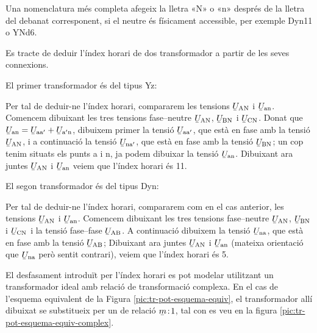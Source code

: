 Una nomenclatura més completa afegeix la lletra «N» o «n» després de la lletra del debanat corresponent, si el neutre és físicament accessible, per exemple Dyn11 o YNd6.


\begin{exemple}
    Es tracte de deduir l'índex horari de dos transformador a partir de les seves connexions.


    El primer transformador és del tipus Yz:
     \vspace{-2mm}
    \begin{center}
        
    \end{center}
     Per tal de deduir-ne l'índex horari, compararem les tensions
    $\cmplx{U}\ped{AN}$ i $\cmplx{U}\ped{an}$. Comencem dibuixant les tres tensions fase--neutre $\cmplx{U}\ped{AN}$, $\cmplx{U}\ped{BN}$ i $\cmplx{U}\ped{CN}$. Donat que $\cmplx{U}\ped{an} = \cmplx{U}\ped{aa'} + \cmplx{U}\ped{a'n}$, dibuixem primer la tensió $\cmplx{U}\ped{aa'}$, que està en fase amb la tensió $\cmplx{U}\ped{AN}$, i a continuació la tensió $\cmplx{U}\ped{na'}$, que està en fase amb la tensió $\cmplx{U}\ped{BN}$; un cop tenim situats els punts a i n, ja podem dibuixar la tensió $\cmplx{U}\ped{an}$. Dibuixant ara juntes $\cmplx{U}\ped{AN}$ i $\cmplx{U}\ped{an}$  veiem que l'índex horari és 11.


     El segon transformador és del tipus Dyn:
      \vspace{-2mm}
    \begin{center}
       
    \end{center}
      Per tal de deduir-ne l'índex horari, compararem com en el cas anterior, les tensions $\cmplx{U}\ped{AN}$ i $\cmplx{U}\ped{an}$. Comencem dibuixant les tres tensions fase--neutre $\cmplx{U}\ped{AN}$, $\cmplx{U}\ped{BN}$ i $\cmplx{U}\ped{CN}$ i la tensió fase--fase $\cmplx{U}\ped{AB}$.  A continuació dibuixem la tensió $\cmplx{U}\ped{na}$, que està en fase amb la tensió $\cmplx{U}\ped{AB}$; Dibuixant ara juntes $\cmplx{U}\ped{AN}$ i $\cmplx{U}\ped{an}$ (mateixa orientació que $\cmplx{U}\ped{na}$ però sentit contrari),  veiem que l'índex horari és 5.
\end{exemple}

El desfasament introduït per l'índex horari es pot modelar utilitzant  un transformador ideal amb relació de transformació complexa. En el cas de l'esquema equivalent de la Figura  \vref{pic:tr-pot-esquema-equiv}, el transformador allí dibuixat
se substitueix per un de relació $\cmplx{m}\!:\!1$, tal con es veu en la figura \vref{pic:tr-pot-esquema-equiv-complex}.

